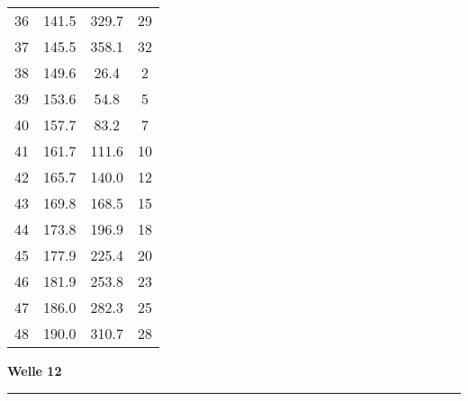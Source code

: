 \documentclass[10pt, a4paper]{article}
\begin{document}
\begin{center}
\begin{tabular}{c|c|c|c}
		36 & 141.5 & 329.7 & 29 \\
		37 & 145.5 & 358.1 & 32 \\
		38 & 149.6 & 26.4 & 2 \\
		39 & 153.6 & 54.8 & 5 \\
		40 & 157.7 & 83.2 & 7 \\
		41 & 161.7 & 111.6 & 10 \\
		42 & 165.7 & 140.0 & 12 \\
		43 & 169.8 & 168.5 & 15 \\
		44 & 173.8 & 196.9 & 18 \\
		45 & 177.9 & 225.4 & 20 \\
		46 & 181.9 & 253.8 & 23 \\
		47 & 186.0 & 282.3 & 25 \\
		48 & 190.0 & 310.7 & 28 \\
	\end{tabular}
\end{center}
\newpage
\centerline{{\bf Welle 12} }
\rule{1.0\textwidth}{0.5mm}
\end{document}
